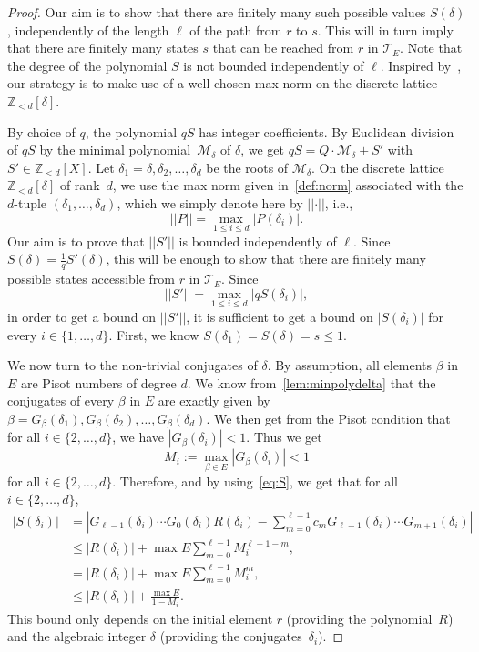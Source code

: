 \documentclass[12pt,reqno]{amsart}
\begin{document}
\begin{proof}
Our aim is to show that there are finitely many such possible values $S(\delta)$, independently of the length $\ell$ of the path from $r$ to $s$. This will in turn imply that there are finitely many states $s$ that can be reached from $r$ in $\mathcal{T}_E$. Note that the degree of the polynomial $S$ is not bounded independently of $\ell$. Inspired by~\cite[Prop.~2.3.33]{CANT}, our strategy is to make use of a well-chosen max norm on the discrete lattice $\mathbb{Z}_{<d}[\delta]$. 


By choice of $q$, the polynomial $qS$ has integer coefficients. By Euclidean division of $qS$ by the minimal polynomial~$\mathcal{M}_\delta$ of $\delta$, we get $qS=Q\cdot \mathcal{M}_\delta+S'$ with $S'\in \mathbb{Z}_{<d}[X]$.
Let $\delta_1=\delta,\delta_2, \ldots, \delta_d$ be the roots of $\mathcal{M}_\delta$. 
On the discrete lattice $\mathbb{Z}_{<d}[\delta]$ of rank~$d$, we use the max norm given in~\cref{def:norm} associated with the $d$-tuple $(\delta_1,\ldots,\delta_d)$, which we simply denote here by $\lvert\lvert\cdot\lvert\lvert$, i.e.,
\[
    \lvert \lvert P\rvert \rvert =\max_{1\le i\le d}|P(\delta_i)|.
\]
Our aim is to prove that $\lvert \lvert S'\rvert \rvert$ is bounded independently of $\ell$. Since $S(\delta)=\frac{1}{q}S'(\delta)$,
this will be enough to show that there are finitely many possible states accessible from $r$ in $\mathcal{T}_E$. Since \[
      \lvert \lvert S'\rvert \rvert =\max_{1\le i\le d}|qS(\delta_i)|,
\] in order to get a bound on $\lvert \lvert S'\rvert \rvert $, it is sufficient to get a bound on $|S(\delta_i)|$ for every $i\in\{1,\ldots,d\}$. First, we know $S(\delta_1)=S(\delta)=s\le 1$.

We now turn to the non-trivial conjugates of $\delta$. By assumption, all elements $\beta$ in $E$ are Pisot numbers of degree $d$. We know from~\cref{lem:minpolydelta} that the conjugates of every $\beta$ in $E$ are exactly given by $\beta=G_\beta(\delta_1),G_\beta(\delta_2),\ldots,G_\beta(\delta_d)$. We then get from the Pisot condition that for all $i\in\{2,\ldots,d\}$, we have $|G_\beta(\delta_i)|<1$. Thus we get
\[
    M_i:=\max_{\beta\in E} |G_\beta(\delta_i)|<1
\] 
for all $i\in\{2,\ldots,d\}$. Therefore, and by using~\eqref{eq:S}, we get that for all $i\in\{2,\ldots,d\}$, 
\begin{align*}
  | S(\delta_i)|
        &=\left| G_{\ell-1}(\delta_i) \cdots G_0(\delta_i) R(\delta_i)
        -\sum_{m=0}^{\ell-1} c_m  G_{\ell-1}(\delta_i) \cdots G_{m+1}(\delta_i)\right|\\
        &\le |R(\delta_i)|+ \max E \sum_{m=0}^{\ell-1}  M_i^{\ell-1-m}, \\
        &=|R(\delta_i)|+\max E \sum_{m=0}^{\ell-1}  M_i^m, \\ 
        &\le |R(\delta_i)|+  \frac{\max E}{1-M_i}.
\end{align*}
This bound only depends on the initial element $r$ (providing the polynomial~$R$) and the algebraic integer $\delta$ (providing the conjugates~$\delta_i$). 
\end{proof}
\end{document}
